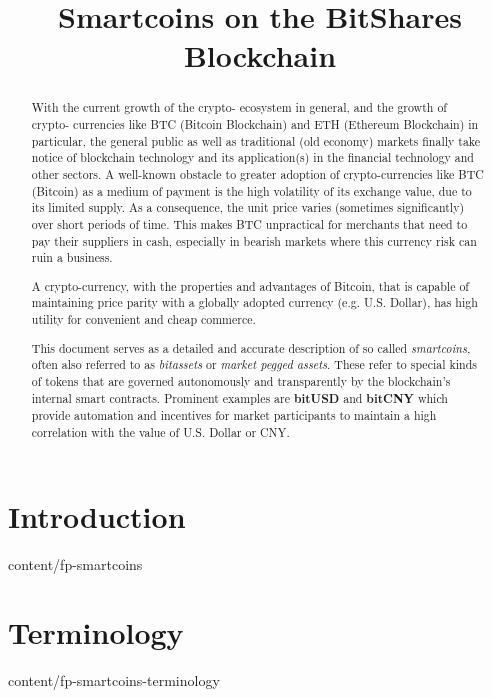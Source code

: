 \documentclass{btswhitepaper}
\title{Smartcoins on the BitShares Blockchain}
\begin{document}
\sloppy
\maketitle

\begin{abstract}%

 With the current growth of the crypto- ecosystem in general, and the
 growth of crypto- currencies like BTC (Bitcoin Blockchain) and ETH
 (Ethereum Blockchain) in particular, the general public as well as
 traditional (old economy) markets finally take notice of blockchain
 technology and its application(s) in the financial technology and other
 sectors. A well-known obstacle to greater adoption of crypto-currencies
 like BTC (Bitcoin) as a medium of payment is the high volatility of its
 exchange value, due to its limited supply. As a consequence, the unit
 price varies (sometimes significantly) over short periods of time. This
 makes BTC unpractical for merchants that need to pay their suppliers in
 cash, especially in bearish markets where this currency risk can ruin a
 business.

 A crypto-currency, with the properties and advantages of Bitcoin, that
 is capable of maintaining price parity with a globally adopted currency
 (e.g. U.S. Dollar), has high utility for convenient and cheap commerce.

 This document serves as a detailed and accurate description of so called
 \emph{smartcoins}, often also referred to as \emph{bitassets} or \emph{market
 pegged assets}. These refer to special kinds of tokens that are governed
 autonomously and transparently by the blockchain's internal smart contracts.
 Prominent examples are \textbf{bitUSD} and \textbf{bitCNY} which provide
 automation and incentives for market participants to maintain a high
 correlation with the value of U.S. Dollar or CNY.

\end{abstract}

\section       { Introduction                                     }  { content/fp-smartcoins             } 
\section       { Terminology                                      }  { content/fp-smartcoins-terminology } 
\end{document}
